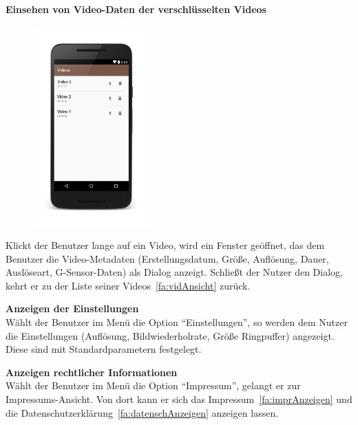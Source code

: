 \begin{enumerate}
\item \label{fa:metaVerschlVid}
\textbf{Einsehen von Video-Daten der verschlüsselten Videos} \hfill \\
\begin{minipage}[t]{\linewidth}
	\begin{figure}
		\vspace{-35pt}
  		\begin{center}
   			\includegraphics[width=0.4\textwidth]{subtopicsFuncspec/Res/Mockups/Videos_list1_phone.png}
  		\end{center}
  		\vspace{-20pt}
  		\vspace{-10pt}
	\end{figure}
Klickt der Benutzer lange auf ein Video, wird ein Fenster geöffnet, das dem Benutzer die Video-\gls{Metadaten} (Erstellungsdatum, Größe, Auflösung, Dauer, Auslöseart, \gls{G-Sensor}-Daten) als Dialog anzeigt. Schließt der Nutzer den Dialog, kehrt er zu der Liste seiner Videos~\eqref{fa:vidAnsicht} zurück.

\item \label{fa:einstAnsicht}\textbf{Anzeigen der Einstellungen} \hfill \\
Wählt der Benutzer im Menü die Option ``Einstellungen'', so werden dem Nutzer die Einstellungen (Auflösung, Bildwiederholrate, Größe \gls{Ringpuffer}) angezeigt. Diese sind mit Standardparametern festgelegt.

\item \label{fa:imprAnsicht}\textbf{Anzeigen rechtlicher Informationen} \hfill \\
Wählt der Benutzer im Menü die Option ``Impressum'', gelangt er zur Impressums-Ansicht. Von dort kann er sich das Impressum~\eqref{fa:imprAnzeigen} und die Datenschutzerklärung~\eqref{fa:datenschAnzeigen} anzeigen lassen.
\end{minipage}


\end{enumerate}
